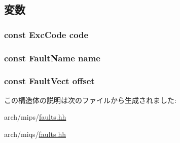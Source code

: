 \subsection{変数}
\hypertarget{structMipsISA_1_1MipsFaultBase_1_1FaultVals_a6aa6b7adf49ca7d5de189897465cfccd}{
\subsubsection[{code}]{\setlength{\rightskip}{0pt plus 5cm}const {\bf ExcCode} {\bf code}}}
\label{structMipsISA_1_1MipsFaultBase_1_1FaultVals_a6aa6b7adf49ca7d5de189897465cfccd}
\hypertarget{structMipsISA_1_1MipsFaultBase_1_1FaultVals_a4d488474632193509a5a7521b4cf58f4}{
\subsubsection[{name}]{\setlength{\rightskip}{0pt plus 5cm}const {\bf FaultName} {\bf name}}}
\label{structMipsISA_1_1MipsFaultBase_1_1FaultVals_a4d488474632193509a5a7521b4cf58f4}
\hypertarget{structMipsISA_1_1MipsFaultBase_1_1FaultVals_adad67944c52549a8b44faffafaa9c48f}{
\subsubsection[{offset}]{\setlength{\rightskip}{0pt plus 5cm}const {\bf FaultVect} {\bf offset}}}
\label{structMipsISA_1_1MipsFaultBase_1_1FaultVals_adad67944c52549a8b44faffafaa9c48f}


この構造体の説明は次のファイルから生成されました:\begin{DoxyCompactItemize}
\item 
arch/mips/\hyperlink{arch_2mips_2faults_8hh}{faults.hh}\item 
arch/miqs/\hyperlink{arch_2miqs_2faults_8hh}{faults.hh}\end{DoxyCompactItemize}
